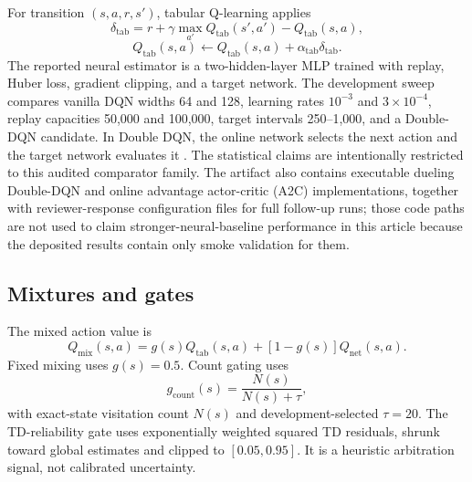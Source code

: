\documentclass[preprint,12pt]{elsarticle}
\begin{document}
For transition $(s,a,r,s')$, tabular Q-learning applies
\begin{equation}
\delta_{\mathrm{tab}} =
r+\gamma\max_{a'}Q_{\mathrm{tab}}(s',a')-Q_{\mathrm{tab}}(s,a),
\end{equation}
\begin{equation}
Q_{\mathrm{tab}}(s,a)\leftarrow Q_{\mathrm{tab}}(s,a)
+\alpha_{\mathrm{tab}}\delta_{\mathrm{tab}}.
\end{equation}
The reported neural estimator is a two-hidden-layer MLP trained with replay,
Huber loss, gradient clipping, and a target network. The development sweep
compares vanilla DQN widths 64 and 128, learning rates $10^{-3}$ and
$3\times10^{-4}$, replay capacities 50,000 and 100,000, target intervals
250--1,000, and a Double-DQN candidate. In Double DQN, the online network
selects the next action and the target network evaluates it
\cite{vanhasselt2016double}. The statistical claims are intentionally restricted
to this audited comparator family. The artifact also contains executable
dueling Double-DQN and online advantage actor-critic (A2C) implementations,
together with reviewer-response configuration files for full follow-up runs;
those code paths are not used to claim stronger-neural-baseline performance in
this article because the deposited results contain only smoke validation for
them.

\subsection{Mixtures and gates}

The mixed action value is
\begin{equation}
Q_{\mathrm{mix}}(s,a)=g(s)Q_{\mathrm{tab}}(s,a)
+[1-g(s)]Q_{\mathrm{net}}(s,a).
\end{equation}
Fixed mixing uses $g(s)=0.5$. Count gating uses
\begin{equation}
g_{\mathrm{count}}(s)=\frac{N(s)}{N(s)+\tau},
\end{equation}
with exact-state visitation count $N(s)$ and development-selected
$\tau=20$. The TD-reliability gate uses exponentially weighted squared TD
residuals, shrunk toward global estimates and clipped to $[0.05,0.95]$. It is
a heuristic arbitration signal, not calibrated uncertainty.
\end{document}
